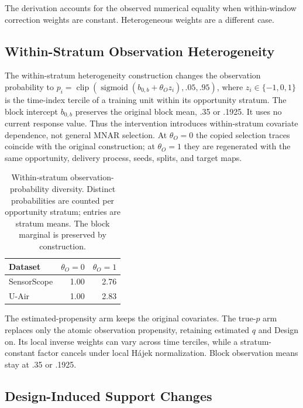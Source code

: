 The derivation accounts for the observed numerical equality when within-window
correction weights are constant. Heterogeneous weights are a different case.


\subsection{Within-Stratum Observation Heterogeneity}

The within-stratum heterogeneity construction changes the observation probability to
$p_i=\operatorname{clip}(\operatorname{sigmoid}(b_{0,b}+\theta_O z_i),.05,.95)$,
where $z_i\in\{-1,0,1\}$ is the time-index tercile of a training unit within
its opportunity stratum.  The block intercept $b_{0,b}$ preserves the original
block mean, .35 or .1925.  It uses no current response value.  Thus the
intervention introduces within-stratum covariate dependence, not general MNAR
selection.  At $\theta_O=0$ the copied selection traces coincide with the
original construction; at $\theta_O=1$ they are regenerated with the same
opportunity, delivery process, seeds, splits, and target maps.

\begin{table}[!htbp]
\centering
\caption{Within-stratum observation-probability diversity. Distinct probabilities are
counted per opportunity stratum; entries are stratum means. The block marginal
is preserved by construction.}
\label{tab:f1_mechanism}
\footnotesize
\begin{tabular*}{\columnwidth}{@{\extracolsep{\fill}}lrr}
\toprule
Dataset & $\theta_O=0$ & $\theta_O=1$\\
\midrule
SensorScope & 1.00 & 2.76\\
U-Air & 1.00 & 2.83\\
\bottomrule
\end{tabular*}
\end{table}

The estimated-propensity arm keeps the original covariates. The true-$p$ arm
replaces only the atomic observation propensity, retaining estimated $q$ and
Design on. Its local inverse weights can vary across time terciles, while a
stratum-constant factor cancels under local H\'ajek normalization. Block
observation means stay at .35 or .1925.

\subsection{Design-Induced Support Changes}

